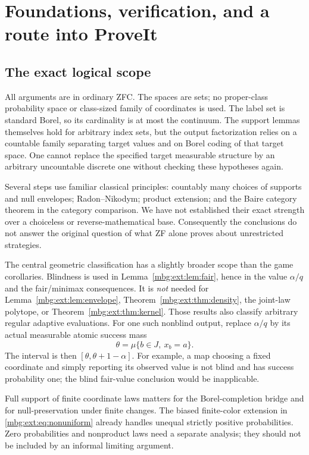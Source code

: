 \documentclass[11pt,letterpaper]{article}
\theoremstyle{definition}
\begin{document}
\section{Foundations, verification, and a route into ProveIt}
\label{mbg:ext:sec:verification}

\subsection{The exact logical scope}

All arguments are in ordinary ZFC. The spaces are sets; no proper-class probability space or class-sized family of coordinates is used. The label set is standard Borel, so its cardinality is at most the continuum. The support lemmas themselves hold for arbitrary index sets, but the output factorization relies on a countable family separating target values and on Borel coding of that target space. One cannot replace the specified target measurable structure by an arbitrary uncountable discrete one without checking these hypotheses again.

Several steps use familiar classical principles: countably many choices of supports and null envelopes; Radon--Nikodym; product extension; and the Baire category theorem in the category comparison. We have not established their exact strength over a choiceless or reverse-mathematical base. Consequently the conclusions do not answer the original question of what ZF alone proves about unrestricted strategies.

The central geometric classification has a slightly broader scope than the game corollaries. Blindness is used in Lemma~\ref{mbg:ext:lem:fair}, hence in the value $\alpha/q$ and the fair/minimax consequences. It is \emph{not} needed for Lemma~\ref{mbg:ext:lem:envelope}, Theorem~\ref{mbg:ext:thm:density}, the joint-law polytope, or Theorem~\ref{mbg:ext:thm:kernel}. Those results also classify arbitrary regular adaptive evaluations. For one such nonblind output, replace $\alpha/q$ by its actual measurable atomic success mass
\[
\theta=\mu\{b\in J,\ x_b=a\}.
\]
The interval is then $[\theta,\theta+1-\alpha]$. For example, a map choosing a fixed coordinate and simply reporting its observed value is not blind and has success probability one; the blind fair-value conclusion would be inapplicable.

Full support of finite coordinate laws matters for the Borel-completion bridge and for null-preservation under finite changes. The biased finite-color extension in \eqref{mbg:ext:eq:nonuniform} already handles unequal strictly positive probabilities. Zero probabilities and nonproduct laws need a separate analysis; they should not be included by an informal limiting argument.
\end{document}
